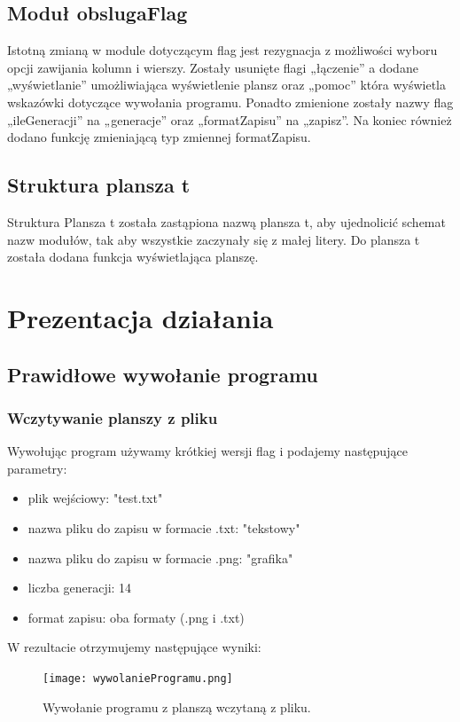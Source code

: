 \documentclass[10pt, oneside]{article}
\begin{document}
\subsection{Moduł obslugaFlag}
Istotną zmianą w module dotyczącym flag jest rezygnacja z możliwości wyboru opcji zawijania kolumn i wierszy. 
Zostały usunięte flagi „łączenie” a dodane „wyświetlanie” umożliwiająca wyświetlenie plansz oraz „pomoc” która wyświetla wskazówki dotyczące wywołania programu. Ponadto zmienione zostały nazwy flag „ileGeneracji” na „generacje” oraz „formatZapisu” na „zapisz”. Na koniec również dodano funkcję zmieniającą typ zmiennej formatZapisu.

\subsection{Struktura plansza t}
Struktura Plansza t została zastąpiona nazwą plansza t, aby ujednolicić schemat nazw modułów, tak aby wszystkie zaczynały się z małej litery. Do plansza t została dodana funkcja wyświetlająca planszę. 

\section{Prezentacja działania}
\subsection{Prawidłowe wywołanie programu}
\subsubsection{Wczytywanie planszy z pliku}
Wywołując program używamy krótkiej wersji flag i podajemy następujące parametry: \\
\begin{itemize}
  \item plik wejściowy: "test.txt"
  \item nazwa pliku do zapisu w formacie .txt: "tekstowy"
  \item nazwa pliku do zapisu w formacie .png: "grafika"
  \item liczba generacji: 14
  \item format zapisu: oba formaty (.png i .txt) 
\end{itemize}
\vspace{15pt}
W rezultacie otrzymujemy następujące wyniki:

\begin{figure}[H]
	\centering
	\texttt{[image: wywolanieProgramu.png]}
	\caption{Wywołanie programu z planszą wczytaną z pliku.}
\end{figure}
\end{document}
